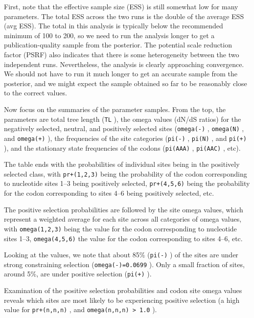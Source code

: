 \documentclass[12pt]{book}
\newcommand{\ttt}[1]{\texttt{#1} }
\begin{document}
First, note that the effective sample size (ESS) is still somewhat low for many parameters. The
total ESS across the two runs is the double of the average ESS (avg ESS). The total in this
analysis is typically below the recommended minimum of 100 to 200, so we need to run the analysis
longer to get a publication-quality sample from the posterior. The potential scale reduction factor
(PSRF) also indicates that there is some heterogeneity between the two independent runs.
Nevertheless, the analysis is clearly approaching convergence. We should not have to run it much
longer to get an accurate sample from the posterior, and we might expect the sample obtained so far
to be reasonably close to the correct values.

Now focus on the summaries of the parameter samples. From the top, the parameters are total tree
length (\ttt{TL}), the omega values (dN/dS ratios) for the negatively selected, neutral, and
positively selected sites (\ttt{omega(-)}, \ttt{omega(N)}, and \ttt{omega(+)}), the frequencies of
the site categories (\ttt{pi(-)}, \ttt{pi(N)}, and \ttt{pi(+)}), and the stationary state
frequencies of the codons (\ttt{pi(AAA)}, \ttt{pi(AAC)}, etc).

The table ends with the probabilities of individual sites being in the positively selected class,
with \ttt{pr+(1,2,3)} being the probability of the codon corresponding to nucleotide sites 1--3
being positively selected, \ttt{pr+(4,5,6)} being the probability for the codon corresponding to
sites 4--6 being positively selected, etc.

The positive selection probabilities are followed by the site omega values, which represent a
weighted average for each site across all categories of omega values, with \ttt{omega(1,2,3)} being
the value for the codon corresponding to nucleotide sites 1--3, \ttt{omega(4,5,6)} the value for
the codon corresponding to sites 4--6, etc.

Looking at the values, we note that about 85\% (\ttt{pi(-)}) of the sites are under strong
constraining selection (\ttt{omega(-)=0.0699}). Only a small fraction of sites, around 5\%, are
under positive selection (\ttt{pi(+)}).

Examination of the positive selection probabilities and codon site omega values reveals which sites
are most likely to be experiencing positive selection (a high value for \ttt{pr+(n,n,n)}, and
\ttt{omega(n,n,n) > 1.0}). 
\end{document}
